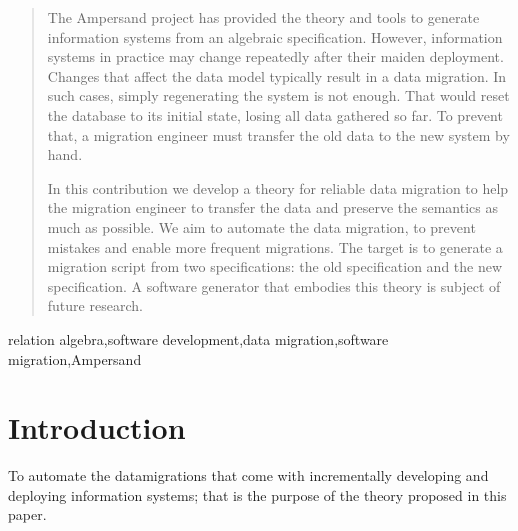 \documentclass{elsarticle}
\begin{document}
\begin{abstract}
   The Ampersand project has provided the theory and tools to generate information systems from an algebraic specification.
   However, information systems in practice may change repeatedly after their maiden deployment.
   Changes that affect the data model typically result in a data migration.
   In such cases, simply regenerating the system is not enough.
   That would reset the database to its initial state, losing all data gathered so far.
   To prevent that, a migration engineer must transfer the old data to the new system by hand.

   In this contribution we develop a theory for reliable data migration to help the migration engineer
   to transfer the data and preserve the semantics as much as possible.
   We aim to automate the data migration,
   to prevent mistakes and enable more frequent migrations.
   The target is to generate a migration script from two specifications: the old specification and the new specification.
   A software generator that embodies this theory is subject of future research.
\end{abstract}

\begin{keyword}
relation algebra\sep software development\sep data migration\sep software migration\sep Ampersand
\end{keyword}
\maketitle

\section{Introduction}
\label{sct:Introduction}
   To automate the datamigrations that come with incrementally developing and deploying information systems;
   that is the purpose of the theory proposed in this paper.
\end{document}
